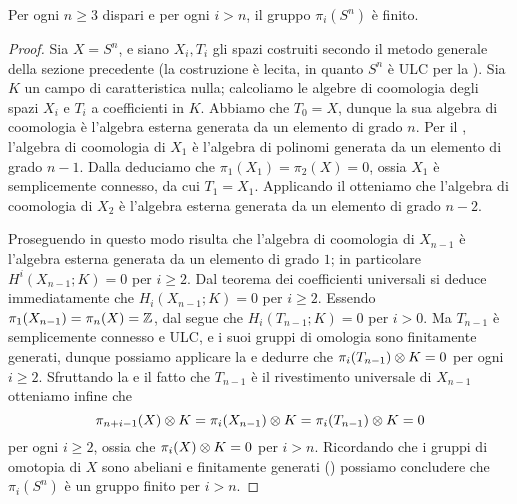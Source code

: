 \begin{proposition}
Per ogni $n\ge 3$ dispari e per ogni $i>n$, il gruppo $\pi_i(S^n)$ è finito.
\end{proposition}
\begin{proof}
Sia $X=S^n$, e siano $X_i,T_i$ gli spazi costruiti secondo il metodo generale della sezione precedente (la costruzione è lecita, in quanto $S^n$ è ULC per la ). Sia $K$ un campo di caratteristica nulla; calcoliamo le algebre di coomologia degli spazi $X_i$ e $T_i$ a coefficienti in $K$. Abbiamo che $T_0=X$, dunque la sua algebra di coomologia è l'algebra esterna generata da un elemento di grado $n$. Per il , l'algebra di coomologia di $X_1$ è l'algebra di polinomi generata da un elemento di grado $n-1$. Dalla  deduciamo che $\pi_1(X_1)=\pi_2(X)=0$, ossia $X_1$ è semplicemente connesso, da cui $T_1=X_1$. Applicando il  otteniamo che l'algebra di coomologia di $X_2$ è l'algebra esterna generata da un elemento di grado $n-2$.

Proseguendo in questo modo risulta che l'algebra di coomologia di $X_{n-1}$ è l'algebra esterna generata da un elemento di grado $1$; in particolare $H^i(X_{n-1};K)=0$ per $i\ge 2$. Dal teorema dei coefficienti universali si deduce immediatamente che $H_i(X_{n-1};K)=0$ per $i\ge 2$. Essendo $\pi_1(X_{n-1})=\pi_n(X)=\mathbb{Z}$, dal  segue che $H_i(T_{n-1};K)=0$ per $i>0$. Ma $T_{n-1}$ è semplicemente connesso e ULC, e i suoi gruppi di omologia sono finitamente generati, dunque possiamo applicare la  e dedurre che $\pi_i(T_{n-1})\mathbin{\otimes} K=0$ per ogni $i\ge 2$. Sfruttando la  e il fatto che $T_{n-1}$ è il rivestimento universale di $X_{n-1}$ otteniamo infine che 
$$
\pi_{n+i-1}(X)\mathbin{\otimes} K=\pi_i(X_{n-1})\mathbin{\otimes} K=\pi_i(T_{n-1})\mathbin{\otimes} K=0
$$
per ogni $i\ge 2$, ossia che $\pi_i(X)\mathbin{\otimes} K=0$ per $i>n$. Ricordando che i gruppi di omotopia di $X$ sono abeliani e finitamente generati () possiamo concludere che $\pi_i(S^n)$ è un gruppo finito per $i>n$.
\end{proof}
